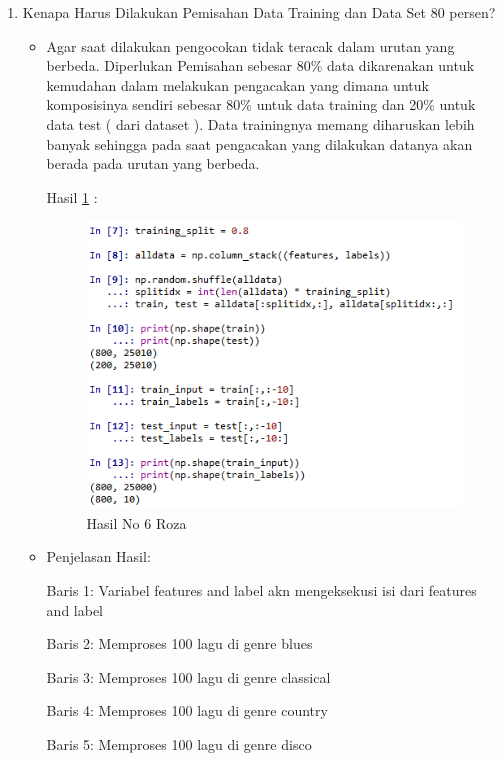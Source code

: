 \begin{enumerate}
\item Kenapa Harus Dilakukan Pemisahan Data Training dan Data Set 80 persen?
\begin{itemize}
\item Agar saat dilakukan pengocokan tidak teracak dalam urutan yang berbeda. Diperlukan Pemisahan sebesar 80\% data dikarenakan untuk kemudahan dalam melakukan pengacakan yang dimana untuk komposisinya sendiri sebesar 80\% untuk data training dan 20\% untuk data test ( dari dataset ). Data trainingnya memang diharuskan lebih banyak sehingga pada saat pengacakan yang dilakukan datanya akan berada pada urutan yang berbeda.

\par Hasil \ref{no6roza} :
\begin{figure}[!hbtp]
\centering
\includegraphics[scale=0.7]{figures/no6roza.png}
\caption{Hasil No 6 Roza}
\label{no6roza}
\end{figure}
\item Penjelasan Hasil:
\par Baris 1: Variabel features and label akn mengeksekusi isi dari features and label
\par Baris 2: Memproses 100 lagu di genre blues
\par Baris 3: Memproses 100 lagu di  genre classical
\par Baris 4: Memproses 100 lagu di  genre country
\par Baris 5: Memproses 100 lagu di  genre disco
\end{itemize}
\par


\end{enumerate}
